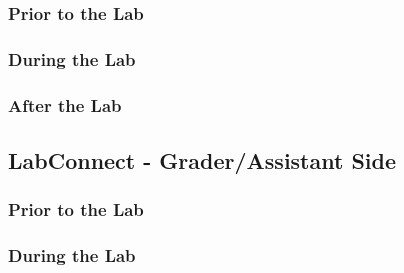 \documentclass[a4paper, 12pt]{article}
\begin{document}
    \subsubsection{Prior to the Lab}
    
    
    \subsubsection{During the Lab}
    
    
    \subsubsection{After the Lab}
    
    
    \subsection{LabConnect - Grader/Assistant Side}
    
    \subsubsection{Prior to the Lab}
    
    
    \subsubsection{During the Lab}
    
\end{document}
